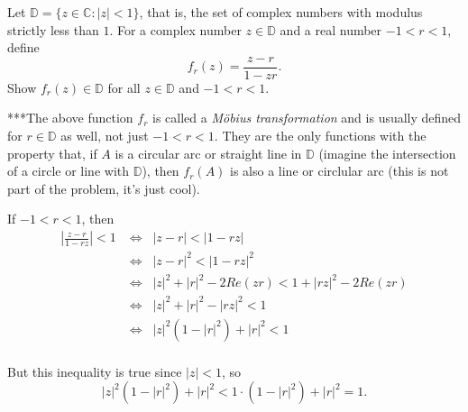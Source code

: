 \documentclass[11pt,dvipsnames]{book}
\numberwithin{equation}{section} %
\numberwithin{figure}{section} %
\numberwithin{table}{section} %
\begin{document}
\begin{exercise} Let $\mathbb{D}=\{z\in \mathbb{C}: |z|<1\}$, that is, the set of complex numbers with modulus strictly less than $1$. For a complex number $z\in \mathbb{D}$ and a real number $-1< r<1$, define
\[
f_{r}(z) = \frac{z-r}{1-zr}.\]
 Show $f_{r}(z)\in \mathbb{D}$ for all $z\in \mathbb{D}$ and $-1<r<1$.


***The above function $f_{r}$ is called a {\it M\"obius transformation} and is usually defined for $r\in \mathbb{D}$ as well, not just $-1<r<1$. They are the only functions with the property that, if $A$ is a circular arc or straight line in $\mathbb{D}$ (imagine the intersection of a circle or line with $\mathbb{D}$), then $f_{r}(A)$ is also a line or circlular arc (this is not part of the problem, it's just cool).







\begin{solution}
If $-1<r<1$, then
\begin{align*}
\left|\frac{z-r}{1-rz}\right|<1
& \Leftrightarrow \;\;|z-r|<|1-rz|\\
&  \Leftrightarrow \;\; |z-r|^{2}<|1-rz|^{2}\\
& \Leftrightarrow \;\; |z|^{2}+|r|^{2}-2Re(zr)<1+|rz|^{2}-2Re(zr)\\
& \Leftrightarrow \;\; |z|^{2}+|r|^{2}-|rz|^{2}<1\\
& \Leftrightarrow \;\; |z|^{2}(1-|r|^{2})+|r|^{2}<1\\
\end{align*}

But this inequality is true since $|z|<1$, so
\[
|z|^{2}(1-|r|^{2})+|r|^{2}<1\cdot (1-|r|^{2})+|r|^{2}=1. 
\]

\end{solution}


\end{exercise}
\end{document}
